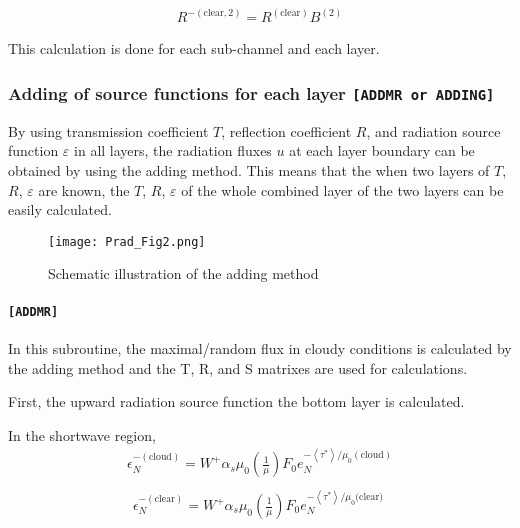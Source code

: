 \begin{equation}
\begin{array}{l}
R^{-(\text {clear}, 2)}=R^{(\text {clear})} B^{(2)}
\end{array}
\end{equation}

This calculation is done for each sub-channel and each layer.

\hypertarget{adding-of-source-functions-for-each-layer-addmr-or-adding}{%
\subsubsection{\texorpdfstring{Adding of source functions for each layer
\texttt{{[}ADDMR\ or\ ADDING{]}}}{Adding of source functions for each layer {[}ADDMR or ADDING{]}}}\label{adding-of-source-functions-for-each-layer-addmr-or-adding}}

By using transmission coefficient \(T\), reflection coefficient \(R\),
and radiation source function \(\varepsilon\) in all layers, the
radiation fluxes \(u\) at each layer boundary can be obtained by using
the adding method. This means that the when two layers of \(T\), \(R\),
\(\varepsilon\) are known, the \(T\), \(R\), \(\varepsilon\) of the
whole combined layer of the two layers can be easily calculated.

\begin{figure}
\centering
\texttt{[image: Prad\_Fig2.png]}
\caption{Schematic illustration of the adding method}
\end{figure}

\hypertarget{addmr}{%
\paragraph{\texorpdfstring{\texttt{{[}ADDMR{]}}}{{[}ADDMR{]}}}\label{addmr}}

In this subroutine, the maximal/random flux in cloudy conditions is
calculated by the adding method and the T, R, and S matrixes are used
for calculations.

First, the upward radiation source function the bottom layer is
calculated.

In the shortwave region, \begin{equation}
\begin{array}{l}
\epsilon_{N}^{-(\text {cloud})}=W^{+} \alpha_{s} \mu_{0}\left(\frac{1}{\mu}\right) F_{0} e_{N}^{-\left\langle\tau^{*}\right\rangle / \mu_{0}(\text{cloud})} \\
\end{array}
\end{equation} \begin{equation}
\begin{array}{l}
\epsilon_{N}^{-(\text {clear})}=W^{+} \alpha_{s} \mu_{0}\left(\frac{1}{\mu}\right) F_{0} e_{N}^{-\left\langle\tau^{*}\right\rangle / \mu_{0} \text {(clear) }}
\end{array}
\end{equation}

